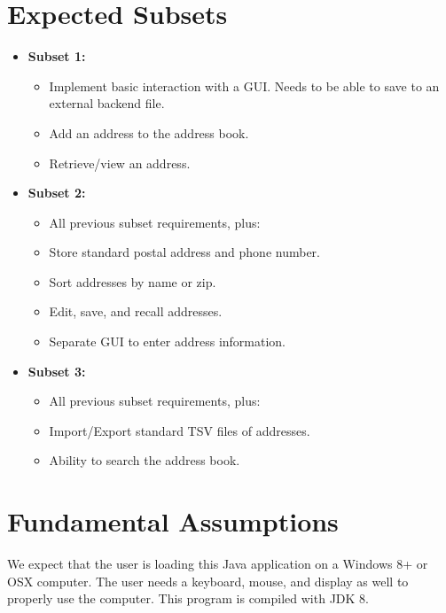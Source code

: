 \documentclass[a4paper, 11pt]{article}
\begin{document}
\section{Expected Subsets}
\begin{itemize}
	\item \textbf{Subset 1:}
	\begin{itemize}
		\item Implement basic interaction with a GUI. Needs to be able to save to an external backend file.
		\item Add an address to the address book.
		\item Retrieve/view an address.
	\end{itemize}
\end{itemize}

\begin{itemize}
	\item \textbf{Subset 2:}
	\begin{itemize}
		\item All previous subset requirements, plus:
		\item Store standard postal address and phone number.
		\item Sort addresses by name or zip.
		\item Edit, save, and recall addresses.
		\item Separate GUI to enter address information.
	\end{itemize}
\end{itemize}

\begin{itemize}
	\item \textbf{Subset 3:}
	\begin{itemize}
		\item All previous subset requirements, plus:
		\item Import/Export standard TSV files of addresses.
		\item Ability to search the address book.
	\end{itemize}
\end{itemize}

\section{Fundamental Assumptions}
We expect that the user is loading this Java application on a Windows 8+ or OSX computer. The user needs a keyboard, mouse, and display as well to properly use the computer. This program is compiled with JDK 8. 
\end{document}
